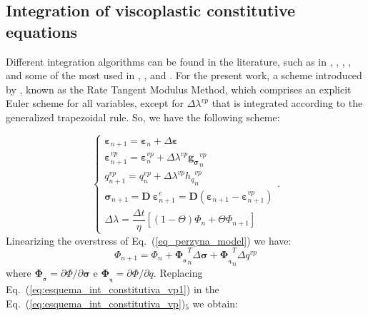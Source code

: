 \documentclass[Journal,letterpaper]{ascelike-new}
\newcommand{\Dsdee}{\boldsymbol{D}}
\newcommand{\hl}{{h_q}}
\newcommand{\dPhidsl}{\boldsymbol{\Phi_{_\sigma}}}
\newcommand{\dPhidql}{\boldsymbol{\Phi_{_q}}}
\newcommand{\dgds}{\boldsymbol{g_\sigma}}
\newcommand{\strain}{\boldsymbol{\varepsilon}}
\newcommand{\stress}{\boldsymbol{\sigma}}
\begin{document}
\subsection{Integration of viscoplastic constitutive equations}

Different integration algorithms can be found in the literature, such as in , , , ,  and some of the most used in , ,  and . For the present work, a scheme introduced by , known as the Rate Tangent Modulus Method, which comprises an explicit Euler scheme for all variables, except for $\Delta \lambda^{vp}$ that is integrated according to the generalized trapezoidal rule. So, we have the following scheme:

\begin{equation}
	\label{eq:esquema_int_constitutiva_vp}
	\left\{
	\begin{array}{lcl}
		\strain_{n+1} = \strain_n + \Delta \strain \\
		\strain_{n+1}^{vp} = \strain_n^{vp} + \Delta \lambda^{vp} \dgds_n^{vp} \\
		q_{n+1}^{vp} = q_n^{vp} + \Delta \lambda^{vp} \hl_n^{vp} \\	
		\stress_{n+1} = \Dsdee~\strain_{n+1}^e = \Dsdee(\strain_{n+1} - \strain_{n+1}^{vp}) \\
		\Delta \lambda = \dfrac{\Delta t}{\eta}[(1-\Theta)\Phi_n + \Theta \Phi_{n+1}]
	\end{array}
	\right..
\end{equation}
Linearizing the overstress of Eq.~(\ref{eq_perzyna_model}) we have:
\begin{equation}
	\label{eq:esquema_int_constitutiva_vp1}
	\Phi_{n+1} = \Phi_n + \dPhidsl_n^T \Delta \stress + \dPhidql_n^T \Delta q^{vp}
\end{equation}
where $\dPhidsl = \partial \Phi / \partial \stress$ e $\dPhidql = \partial \Phi / \partial q$. Replacing  Eq.~(\ref{eq:esquema_int_constitutiva_vp1}) in the Eq.~(\ref{eq:esquema_int_constitutiva_vp})$_5$ we obtain:
\end{document}
